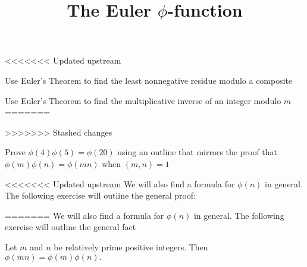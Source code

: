 \documentclass{ximera}
\title{The Euler $\phi$-function}
\begin{document}
\begin{abstract}
\end{abstract}
\maketitle

<<<<<<< Updated upstream

\begin{obj}
\item Use Euler's Theorem to find the least nonnegative residue modulo a composite
\item Use Euler's Theorem to find the multiplicative inverse of an integer modulo $m$
=======
% 

\begin{obj}
>>>>>>> Stashed changes
\item Prove $\phi(4)\phi(5)=\phi(20)$ using an outline that mirrors the proof that $\phi(m)\phi(n)=\phi(mn)$ when $(m,n)=1$
\end{obj}


<<<<<<< Updated upstream
We will also find a formula for $\phi(n)$ in general. The following exercise will outline the general proof:

\begin{br}
=======
We will also find a formula for $\phi(n)$ in general. The following exercise will outline the general fact 


\begin{theorem}\label{thm:phi-multiplicative}
    Let $m$ and $n$ be relatively prime positive integers. Then $\phi(mn)=\phi(m)\phi(n).$
\end{theorem}


\end{br}
\end{obj}
\end{document}
